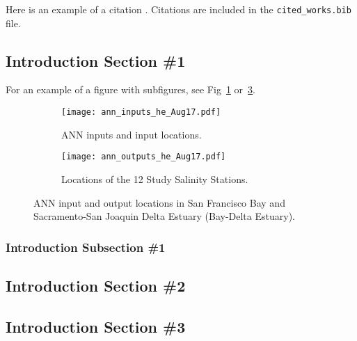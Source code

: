 
Here is an example of a citation \cite{ref:oetiker1995not}. Citations are included in the \texttt{cited\_works.bib} file.

\blindtext

\subsection{Introduction Section \#1}
\label{sect:intro_1}

For an example of a figure with subfigures, see Fig~\ref{fig:ann_inputs} or~\ref{fig:ann_outputs}.

\blindtext 

\begin{figure}[htbp]
	\begin{subfigure}[t]{.45\textwidth}
		\centering
		\texttt{[image: ann\_inputs\_he\_Aug17.pdf]}
		\caption{ANN inputs and input locations.}
		\label{fig:ann_inputs}
	\end{subfigure}
	\begin{subfigure}[t]{.45\textwidth}
		\centering
		\texttt{[image: ann\_outputs\_he\_Aug17.pdf]}
		\caption{Locations of the 12 Study Salinity Stations.}
		\label{fig:ann_outputs}
	\end{subfigure}
\caption{ANN input and output locations in San Francisco Bay and Sacramento-San Joaquin Delta Estuary (Bay-Delta Estuary).}
\end{figure}

\subsubsection{Introduction Subsection \#1}
\label{sect:intro_1}
\blindtext
\blindtext

\subsection{Introduction Section \#2}
\label{sect:intro_2}

\blindtext 

\subsection{Introduction Section \#3}
\label{sect:intro_3}
\blindtext
